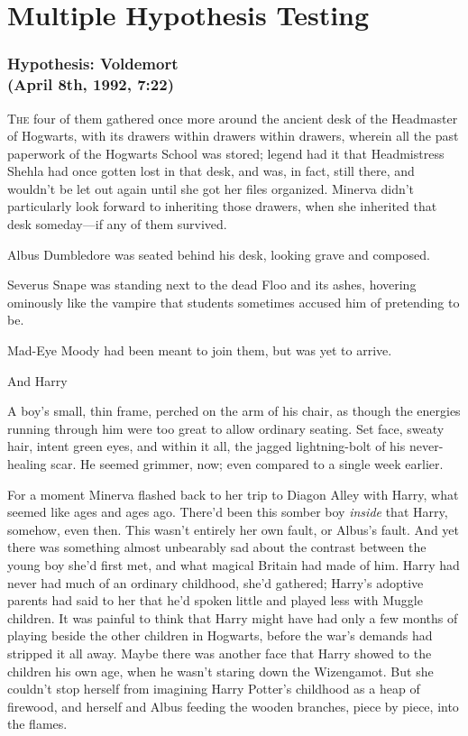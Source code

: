 \chapter{Multiple Hypothesis Testing}

\subsection{Hypothesis: Voldemort\\
(April 8th, 1992, 7:22\PM)}

\lettrine{T}{he} four of them gathered once more around the ancient desk of the Headmaster
of Hogwarts, with its drawers within drawers within drawers, wherein all the
past paperwork of the Hogwarts School was stored; legend had it that
Headmistress Shehla had once gotten lost in that desk, and was, in fact, still
there, and wouldn't be let out again until she got her files organized. Minerva
didn't particularly look forward to inheriting those drawers, when she
inherited that desk someday—if any of them survived.

Albus Dumbledore was seated behind his desk, looking grave and composed.

Severus Snape was standing next to the dead Floo and its ashes, hovering
ominously like the vampire that students sometimes accused him of pretending to
be.

Mad-Eye Moody had been meant to join them, but was yet to arrive.

And Harry{\el}

A boy's small, thin frame, perched on the arm of his chair, as though the
energies running through him were too great to allow ordinary seating. Set
face, sweaty hair, intent green eyes, and within it all, the jagged
lightning-bolt of his never-healing scar. He seemed grimmer, now; even compared
to a single week earlier.

For a moment Minerva flashed back to her trip to Diagon Alley with Harry, what
seemed like ages and ages ago. There'd been this somber boy \emph{inside} that
Harry, somehow, even then. This wasn't entirely her own fault, or Albus's
fault. And yet there was something almost unbearably sad about the contrast
between the young boy she'd first met, and what magical Britain had made of
him. Harry had never had much of an ordinary childhood, she'd gathered; Harry's
adoptive parents had said to her that he'd spoken little and played less with
Muggle children. It was painful to think that Harry might have had only a few
months of playing beside the other children in Hogwarts, before the war's
demands had stripped it all away. Maybe there was another face that Harry
showed to the children his own age, when he wasn't staring down the Wizengamot.
But she couldn't stop herself from imagining Harry Potter's childhood as a heap
of firewood, and herself and Albus feeding the wooden branches, piece by piece,
into the flames.


